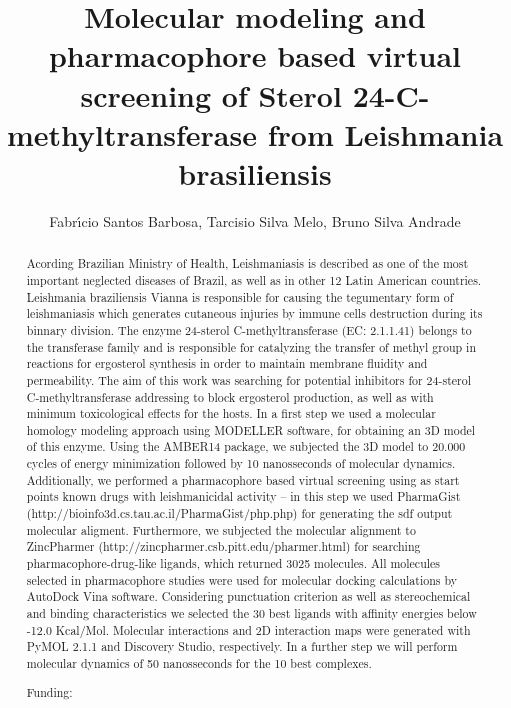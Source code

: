 \documentclass[twoside]{article}
\title{\vspace{-15mm}\fontsize{24pt}{10pt}\selectfont\textbf{ Molecular modeling and pharmacophore based virtual screening of Sterol 24-C-  methyltransferase from Leishmania  brasiliensis }} %
\author{ Fabr\'{\i}cio Santos Barbosa, Tarcisio Silva Melo, Bruno Silva Andrade }
\affil{ Universidade Estadual do Sudoeste da Bahia,  Brazil }
\date{}
\begin{document}
  
  
  \maketitle %
  
  
  \thispagestyle{fancy} %
  
  
  \begin{abstract}
  Acording Brazilian Ministry of Health,  Leishmaniasis is described as one of the most important neglected diseases of Brazil,  as well as in other 12 Latin American countries. Leishmania braziliensis Vianna is responsible for causing the tegumentary form of leishmaniasis which generates cutaneous injuries by immune cells destruction during its binnary division. The enzyme 24-sterol C-methyltransferase (EC: 2.1.1.41) belongs to the transferase family and is responsible for catalyzing the transfer of methyl group in reactions for ergosterol synthesis in order to maintain membrane fluidity and permeability. The aim of this work was searching for potential inhibitors for 24-sterol C-methyltransferase addressing to block ergosterol production,  as well as with minimum toxicological effects for the hosts. In a first step we used a molecular homology modeling approach using MODELLER software,  for obtaining an 3D model of this enzyme. Using the AMBER14 package,  we subjected the 3D model to 20.000 cycles of energy minimization followed by 10 nanosseconds of molecular dynamics. Additionally,  we performed a pharmacophore based virtual screening using as start points known drugs with leishmanicidal activity – in this step we used PharmaGist (http://bioinfo3d.cs.tau.ac.il/PharmaGist/php.php) for generating the sdf output molecular aligment. Furthermore,  we subjected the molecular alignment to ZincPharmer (http://zincpharmer.csb.pitt.edu/pharmer.html) for searching pharmacophore-drug-like ligands,  which returned 3025 molecules. All molecules selected in pharmacophore studies were used for molecular docking calculations by AutoDock Vina software. Considering punctuation criterion as well as stereochemical and binding characteristics we selected the 30 best ligands with affinity energies below -12.0 Kcal/Mol. Molecular interactions and 2D interaction maps were generated with PyMOL 2.1.1 and Discovery Studio,  respectively. In a further step we will perform molecular dynamics of 50 nanosseconds for  the 10 best complexes.
  
  Funding:  \\ 
  \end{abstract}
  
\end{document}
